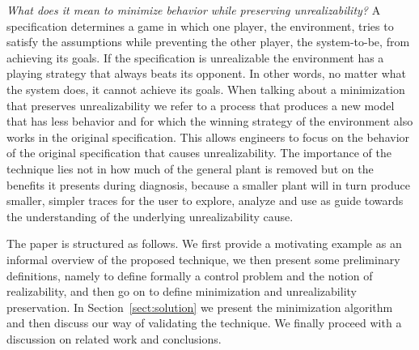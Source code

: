 \textit{What does it mean to minimize behavior while preserving unrealizability?} A specification determines a game in which one player, the environment, tries to satisfy the assumptions while preventing the other player, the system-to-be, from achieving its goals. If the specification is unrealizable the environment has a playing strategy that always beats its opponent. In other words, no matter what the system does, it cannot achieve its goals. When talking about a minimization that preserves unrealizability we refer to a process that produces a new model that has less behavior and for which the winning strategy of the environment also works in the original specification. This allows engineers to focus on the behavior of the original specification that causes unrealizability. The importance of the technique lies not in how much of the general plant is removed but on the benefits it presents during diagnosis, because a smaller plant will in turn produce smaller, simpler traces for the user to explore, analyze and use as guide towards the understanding of the underlying unrealizability cause.




The paper is structured as follows. We first provide a motivating example as an informal overview of the proposed technique, we then present some preliminary definitions, namely to define formally a control problem and the notion of realizability, and then go on to define minimization and unrealizability preservation. In Section~\ref{sect:solution} we present the minimization algorithm and then discuss our way of validating the technique. We finally proceed with a discussion on related work and conclusions.